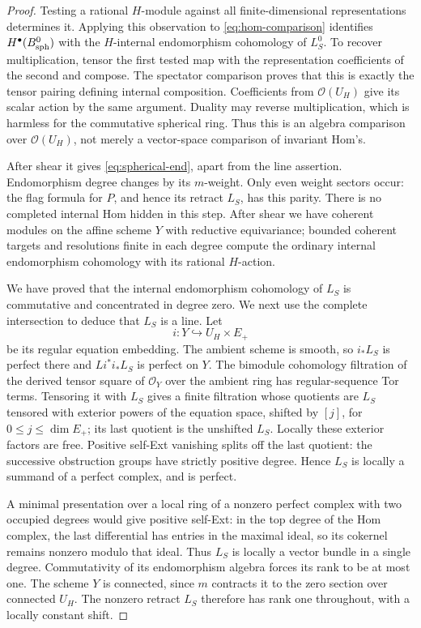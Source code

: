 \documentclass[11pt]{article}
\numberwithin{equation}{section}
\theoremstyle{definition}
\theoremstyle{remark}
\newcommand{\cO}{\mathcal O}
\begin{document}
\begin{proof}
Testing a rational $H$-module against all finite-dimensional
representations determines it.  Applying this observation to
\eqref{eq:hom-comparison} identifies
$H^\bullet(B_{\rm sph}^0)$ with the $H$-internal endomorphism
cohomology of $L_S^0$.  To recover multiplication, tensor the first
tested map with the representation coefficients of the second and
compose.  The spectator comparison proves that this is exactly the
tensor pairing defining internal composition.  Coefficients from
$\cO(U_H)$ give its scalar action by the same argument.  Duality may
reverse multiplication, which is harmless for the commutative
spherical ring.  Thus this is an algebra comparison over
$\cO(U_H)$, not merely a vector-space comparison of invariant Hom's.

After shear it gives \eqref{eq:spherical-end}, apart from the line
assertion.  Endomorphism degree changes by its $m$-weight.  Only even
weight sectors occur: the flag formula for $P$, and hence its retract
$L_S$, has this parity.  There is no completed internal Hom hidden
in this step.  After shear we have coherent modules on the affine
scheme $Y$ with reductive equivariance; bounded coherent targets
and resolutions finite in each degree compute the ordinary internal
endomorphism cohomology with its rational $H$-action.

We have proved that the internal endomorphism cohomology of $L_S$ is
commutative and concentrated in degree zero.  We next use the complete
intersection to deduce that $L_S$ is a line.  Let
\[
 i:Y\hookrightarrow U_H\times E_+
\]
be its regular equation embedding.  The ambient scheme is smooth,
so $i_*L_S$ is perfect there and $Li^*i_*L_S$ is perfect on $Y$.
The bimodule cohomology filtration of the derived tensor square of
$\cO_Y$ over the ambient ring has regular-sequence Tor terms.
Tensoring it with $L_S$ gives a finite filtration whose quotients are
$L_S$ tensored with exterior powers of the equation space, shifted
by $[j]$, for $0\le j\le\dim E_+$; its last quotient is the unshifted
$L_S$.  Locally these exterior factors are free.  Positive self-Ext
vanishing splits off the last quotient: the successive obstruction
groups have strictly positive degree.  Hence $L_S$ is locally a
summand of a perfect complex, and is perfect.

A minimal presentation over a local ring of a nonzero perfect complex
with two occupied degrees would give positive self-Ext: in the top
degree of the Hom complex, the last differential has entries in the
maximal ideal, so its cokernel remains nonzero modulo that ideal.
Thus $L_S$ is locally a vector bundle in a single degree.
Commutativity of its endomorphism algebra forces its rank to be at
most one.  The scheme $Y$ is connected, since $m$ contracts it to the
zero section over connected $U_H$.  The nonzero retract $L_S$
therefore has rank one throughout, with a locally constant shift.


\end{proof}
\end{document}
